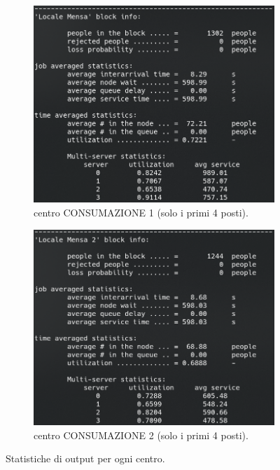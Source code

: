 \documentclass{article}
\begin{document}
\begin{figure}[H]
\begin{subfigure}{.5\textwidth}
  \centering
  \includegraphics[width=.9\linewidth]{img/migliorativo_2_1/consumazione_1.png}
  \caption{centro CONSUMAZIONE 1 (solo i primi 4 posti).}
\end{subfigure}
\begin{subfigure}{.5\textwidth}
  \centering
  \includegraphics[width=.9\linewidth]{img/migliorativo_2_1/consumazione_2.png}
  \caption{centro CONSUMAZIONE 2 (solo i primi 4 posti).}
\end{subfigure}
\caption{Statistiche di output per ogni centro.}
\label{fig:output_ext_2_pol_1_consumazioni}
\end{figure}
\FloatBarrier
\end{document}

